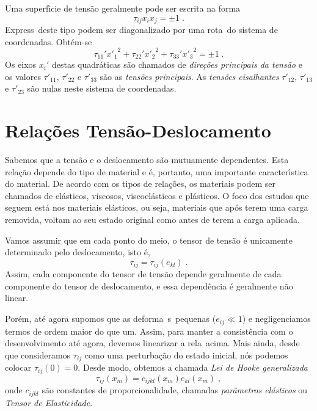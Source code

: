 Uma superf\'{\i}cie de tens\~ao geralmente pode ser escrita na
forma
\begin{equation}
\tau_{ij} x_i x_j = \pm 1 \;.
\end{equation}
Express\oes\ deste tipo podem ser diagonalizado por uma rota\cao\ do
sistema de coordenadas. Obt\'em-se
\begin{equation}
\tau_{11}' {x'_1}^2 + \tau_{22}' {x'_2}^2 +
\tau_{33}' {x'_3}^2 = \pm 1 \;.
\end{equation}
Os eixos $x_i'$ destas quadr\'aticas s\~ao chamados de {\it
dire\c{c}\~oes principais da tens\~ao} e os valores
$\tau'_{11}$, $\tau'_{22}$ e $\tau'_{33}$ s\~ao as {\it
tens\~oes principais}. As {\it tens\~oes cisalhantes} $\tau'_{12}$,
$\tau'_{13}$ e $\tau'_{23}$ s\~ao nulas neste sistema
de coordenadas.



\section{Rela\c{c}\~oes Tens\~ao-Deslocamento}

Sabemos que a tens\~ao e o deslocamento s\~ao mutuamente
dependentes. Esta rela\c{c}\~ao depende do tipo de material e \'e,
portanto, uma importante caracter\'{\i}stica do material. De
acordo com os tipos de rela\c{c}\~oes, os materiais podem ser
chamados de el\'asticos, viscosos, viscoel\'asticos e pl\'asticos.
O foco dos estudos que seguem est\'a nos materiais el\'asticos, ou
seja, materiais que ap\'os terem uma carga removida, voltam ao seu
estado original como antes de terem a carga aplicada.

Vamos assumir que em cada ponto do meio, o tensor de tens\~ao \'e
unicamente determinado pelo deslocamento, isto \'e,
\begin{equation}
\tau_{ij}=\tau_{ij}(e_{kl}) \;.
\label{rel_tens_def}
\end{equation}
Assim, cada componente do tensor de tens\~ao depende geralmente de
cada componente do tensor de deslocamento, e essa depend\^encia
\'e geralmente n\~ao linear.

Por\'em, at\'e agora supomos que as deforma\coes\ s\ao\ pequenas
($e_{ij}\ll 1$) e negligenciamos termos de ordem maior do que um. Assim,
para manter a consist\^encia com o desenvolvimento at\'e agora, devemos
linearizar a rela\cao\ acima. Mais ainda, desde que consideramos
$\tau_{ij}$ como uma perturba\c{c}\~ao do estado inicial, n\'os podemos
colocar $\tau_{ij}(0)=0$. Desde modo, obtemos a chamada {\it Lei de Hooke
generalizada}
\begin{equation}
\tau_{ij}(x_m)=c_{ijkl}(x_m)e_{kl} (x_m) \;,
\label{lei_hooke}
\end{equation}
onde $c_{ijkl}$ s\~ao constantes de proporcionalidade, chamadas {\it
par\^ametros el\'asticos} ou {\it Tensor de Elasticidade}.


